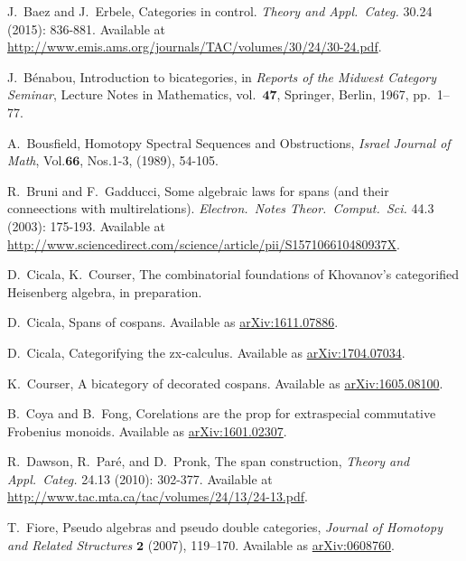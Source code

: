 \documentclass[11pt]{amsart}
\newcommand{\cat}[1]{\mathbf{#1}}
\theoremstyle{remark}
\theoremstyle{definition}
\begin{document}
%
\begin{thebibliography}{100}

J.~Baez and J.~Erbele,
Categories in control.
\emph{Theory and Appl.~Categ.} 
30.24 (2015): 836-881.
Available at \href{http://www.emis.ams.org/journals/TAC/volumes/30/24/30-24.pdf}{http://www.emis.ams.org/journals/TAC/volumes/30/24/30-24.pdf}.

J.~B\'enabou, 
Introduction to bicategories, 
in \emph{Reports of the Midwest Category Seminar}, 
Lecture Notes in Mathematics, 
vol.\ $\cat{47}$, 
Springer, Berlin, 1967, pp.\ 1--77. 

A.\ Bousfield,
Homotopy Spectral Sequences and Obstructions,
\emph{Israel Journal of Math},
Vol.$\mathbf{66}$, Nos.1-3, (1989), 54-105.

R.~Bruni and F.~Gadducci,
Some algebraic laws for spans (and their conneections with multirelations).
\emph{Electron.~Notes Theor.~Comput.~Sci.}
44.3 (2003): 175-193.
Available at \href{http://www.sciencedirect.com/science/article/pii/S157106610480937X}{http://www.sciencedirect.com/science/article/pii/S157106610480937X}.


D.~Cicala, K.~Courser,
The combinatorial foundations of Khovanov's categorified Heisenberg algebra, in preparation.

D.~Cicala, 
Spans of cospans.
Available as \href{https://arxiv.org/abs/1611.07886}{arXiv:1611.07886}.

D.~Cicala, 
Categorifying the zx-calculus.
Available as \href{https://arxiv.org/abs/1704.07034}{arXiv:1704.07034}.

K.~Courser, 
A bicategory of decorated cospans. 
Available as \href{https://arxiv.org/pdf/1605.08100v2.pdf}{arXiv:1605.08100}.

B.~Coya and B.~Fong,
Corelations are the prop for extraspecial commutative Frobenius monoids.
Available as \href{https://arxiv.org/abs/1601.02307}{arXiv:1601.02307}.

R.~Dawson, R.~Par\'{e}, and D.~Pronk, 
The span construction, 
\emph{Theory and Appl.~Categ.} 
24.13 (2010): 302-377.
Available at \href{http://www.tac.mta.ca/tac/volumes/24/13/24-13.pdf}{http://www.tac.mta.ca/tac/volumes/24/13/24-13.pdf}.

T.~Fiore, 
Pseudo algebras and pseudo double categories, 
\emph{Journal of Homotopy and Related Structures} $\mathbf{2}$ 
(2007), 119--170. 
Available as \href{http://arxiv.org/abs/math/0608760}{arXiv:0608760}.


\end{thebibliography}
\end{document}
